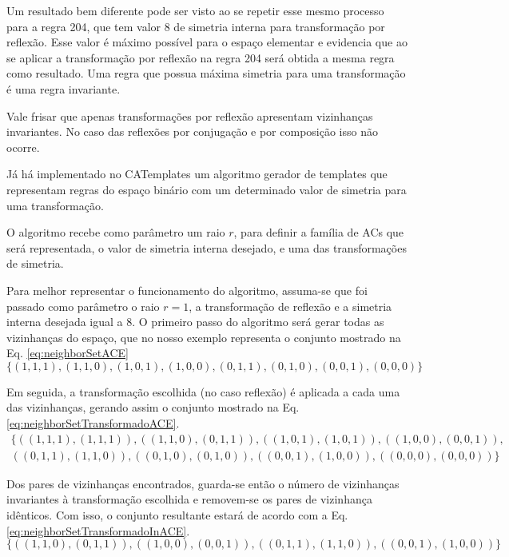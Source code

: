 Um resultado bem diferente pode ser visto ao se repetir esse mesmo processo para a regra 204, que tem valor 8 de simetria interna para transformação por reflexão. Esse valor é máximo possível para o espaço elementar e evidencia que ao se aplicar a transformação por reflexão na regra 204 será obtida a mesma regra como resultado. Uma regra que possua máxima simetria para uma transformação é uma regra invariante.

Vale frisar que apenas transformações por reflexão apresentam vizinhanças invariantes. No caso das reflexões por conjugação e por composição isso não ocorre.

Já há implementado no CATemplates um algoritmo gerador de templates que representam regras do espaço binário com um determinado valor de simetria para uma transformação.

O algoritmo recebe como parâmetro um raio $r$, para definir a família de ACs que será representada, o valor de simetria interna desejado, e uma das transformações de simetria.

Para melhor representar o funcionamento do algoritmo, assuma-se que foi passado como parâmetro o raio $r = 1$, a transformação de reflexão e a simetria interna desejada igual a 8. O primeiro passo do algoritmo será gerar todas as vizinhanças do espaço, que no nosso exemplo representa o conjunto mostrado na Eq. \eqref{eq:neighborSetACE}
\begin{equation}
\{(1,1,1),(1,1,0),
(1,0,1),(1,0,0),
(0,1,1),(0,1,0),
(0,0,1),(0,0,0)\}
\label{eq:neighborSetACE}
\end{equation}

Em seguida, a transformação escolhida (no caso reflexão) é aplicada a cada uma das vizinhanças, gerando assim o conjunto mostrado na Eq. \eqref{eq:neighborSetTransformadoACE}.  
\begin{equation}
\begin{split}
\{
((1,1,1),(1,1,1)),
((1,1,0),(0,1,1)),
((1,0,1),(1,0,1)),
((1,0,0),(0,0,1)),\\
((0,1,1),(1,1,0)),
((0,1,0),(0,1,0)),
((0,0,1),(1,0,0)),
((0,0,0),(0,0,0))\}
\label{eq:neighborSetTransformadoACE}
\end{split}
\end{equation}

Dos pares de vizinhanças encontrados, guarda-se então o número de vizinhanças invariantes à transformação escolhida e removem-se os pares de vizinhança idênticos. Com isso, o conjunto resultante estará de acordo com a Eq. \eqref{eq:neighborSetTransformadoInACE}.
\begin{equation}
\{((1,1,0),(0,1,1)),
((1,0,0),(0,0,1)),
((0,1,1),(1,1,0)),
((0,0,1),(1,0,0))\}
\label{eq:neighborSetTransformadoInACE}
\end{equation}

